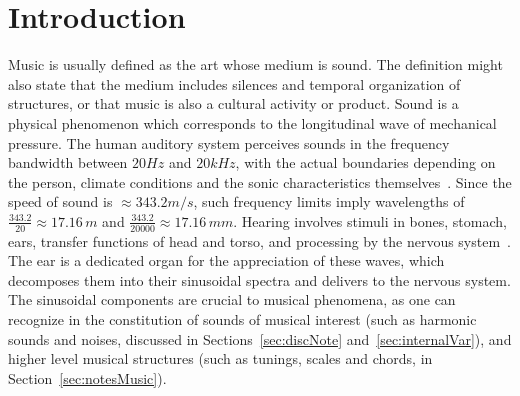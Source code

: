 \section{Introduction}\label{sec:level1}
Music is usually defined as the art whose medium is sound.
The definition might also state that the medium includes silences
and temporal organization of structures, or that music
is also a cultural activity or product.
Sound is a physical phenomenon which corresponds to the longitudinal wave of mechanical pressure.
The human auditory system perceives sounds in the frequency bandwidth between $20Hz$ and $20kHz$,
with the actual boundaries depending on the person,
climate conditions and the sonic characteristics themselves~\cite{Roederer}.
Since the speed of sound is $\approx 343.2 m/s$,
such frequency limits imply wavelengths of $\frac{343.2}{20} \approx 17.16\,m$ and
$\frac{343.2}{20000} \approx 17.16\,mm$.
Hearing involves stimuli in bones, stomach, ears,
transfer functions of head and torso,
and processing by the nervous system~\cite{Roederer}.
The ear is a dedicated organ for the appreciation of these waves,
which decomposes them into their sinusoidal spectra and delivers to the nervous system.
The sinusoidal components are crucial to musical phenomena,
as one can recognize in the constitution of sounds of musical interest
(such as harmonic sounds and noises, discussed in Sections~\ref{sec:discNote} and~\ref{sec:internalVar}),
and higher level musical structures (such as tunings, scales and chords, in Section~\ref{sec:notesMusic}).

